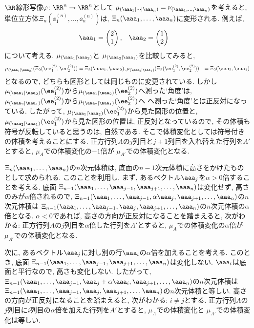 $\RR$線形写像$\varphi\colon \RR^n\to\RR^n$として
$\mu_{(\aaa_1|\cdots|\aaa_n)}=\nu_{(\aaa_1,\ldots,\aaa_n)}$を考えると,
単位立方体$\Xi_n(\ee^{(n)}_1,\ldots,\ee^{(n)}_n)$は,
$\Xi_n(\aaa_1,\ldots,\aaa_n)$に変形される.
例えば,
\begin{align*}
\aaa_1&=\begin{pmatrix}2\\1\end{pmatrix},&\aaa_2&=\begin{pmatrix}1\\2\end{pmatrix}
\end{align*}
について考える.
$\mu_{(\aaa_1|\aaa_2)}$と
$\mu_{(\aaa_2|\aaa_1)}$を比較してみると,
\begin{align*}
\mu_{(\aaa_1|\aaa_2)}(\Xi_2(\ee^{(2)}_1,\ee^{(2)}_2))&=\Xi_2(\aaa_1,\aaa_2),
\mu_{(\aaa_2|\aaa_1)}(\Xi_2(\ee^{(2)}_1,\ee^{(2)}_2))&=\Xi_2(\aaa_2,\aaa_1)
\end{align*}
となるので, どちらも図形としては同じものに変更されている.
しかし
$\mu_{(\aaa_1|\aaa_2)}(\ee^{(2)}_1)$から$\mu_{(\aaa_1|\aaa_2)}(\ee^{(2)}_2)$へ測った`角度'は,
$\mu_{(\aaa_2|\aaa_1)}(\ee^{(2)}_1)$から$\mu_{(\aaa_2|\aaa_1)}(\ee^{(2)}_2)$へ
へ測った`角度'とは正反対になっている.
したがって, 
$\mu_{(\aaa_1|\aaa_2)}(\ee^{(2)}_1)$から見た図形の位置と,
$\mu_{(\aaa_2|\aaa_1)}(\ee^{(2)}_1)$から見た図形の位置は,
正反対となっているので,
その体積も符号が反転していると思うのは, 自然である.
そこで体積変化としては符号付きの体積を考えることにする.
正方行列$A$の$j$列目と$j+1$列目を入れ替えた行列を$A'$とすると,
$\mu_{A}$での体積変化の$-1$倍が
$\mu_{A'}$での体積変化となる.

$\Xi_n(\aaa_1,\ldots,\aaa_n)$の$n$次元体積は,
底面の$n-1$次元体積に高さをかけたものとして求められる.
このことを利用し,
まず,
あるベクトル$\aaa_j$を$\alpha>0$倍することを考える.
底面
$\Xi_{n-1}(\aaa_1,\ldots,\aaa_{j-1},\aaa_{j+1},\ldots,\aaa_n)$は変化せず,
高さのみが$\alpha$倍されるので,
$\Xi_{n-1}(\aaa_1,\ldots,\aaa_{j-1},\alpha\aaa_{j},\aaa_{j+1},\ldots,\aaa_n)$の$n$次元体積は
$\Xi_{n-1}(\aaa_1,\ldots,\aaa_{j-1},\aaa_{j},\aaa_{j+1},\ldots,\aaa_n)$の$n$次元体積の$\alpha$倍となる.
$\alpha<0$であれば,
高さの方向が正反対になることを踏まえると, 次がわかる:
正方行列$A$の$j$列目を$\alpha$倍した行列を$A'$とすると,
$\mu_{A}$での体積変化の$\alpha$倍が
$\mu_{A'}$での体積変化となる.

次に,
あるベクトル$\aaa_j$に対し別の行$\aaa_i$の$\alpha$倍を加えることを考える.
このとき, 
底面
$\Xi_{n-1}(\aaa_1,\ldots,\aaa_{j-1},\aaa_{j+1},\ldots,\aaa_n)$は変化しない.
$\aaa_i$は底面と平行なので,
高さも変化しない.
したがって,
$\Xi_{n-1}(\aaa_1,\ldots,\aaa_{j-1},\aaa_{j}+\alpha\aaa_i,\aaa_{j+1},\ldots,\aaa_n)$の$n$次元体積は
$\Xi_{n-1}(\aaa_1,\ldots,\aaa_{j-1},\aaa_{j},\aaa_{j+1},\ldots,\aaa_n)$の$n$次元体積と等しい.
高さの方向が正反対になることを踏まえると, 次がわかる:
$i\neq j$とする.
正方行列$A$の$j$列目に$i$列目の$\alpha$倍を加えた行列を$A'$とすると,
$\mu_{A}$での体積変化と
$\mu_{A'}$での体積変化は等しい.


